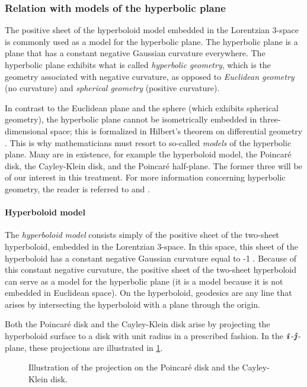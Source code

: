 \subsubsection{Relation with models of the hyperbolic plane}
The positive sheet of the hyperboloid model embedded in the Lorentzian 3-space is commonly used as a model for the hyperbolic plane. The hyperbolic plane is a plane that has a constant negative Gaussian curvature everywhere. The hyperbolic plane exhibits what is called \emph{hyperbolic geometry}, which is the geometry associated with negative curvature, as opposed to \emph{Euclidean geometry} (no curvature) and \emph{spherical geometry} (positive curvature). 

In contrast to the Euclidean plane and the sphere (which exhibits spherical geometry), the hyperbolic plane cannot be isometrically embedded in three-dimensional space; this is formalized in Hilbert's theorem on differential geometry \cite{Thurston1997}. This is why mathematicians must resort to so-called \emph{models} of the hyperbolic plane. Many are in existence, for example the hyperboloid model, the Poincaré disk, the Cayley-Klein disk, and the Poincaré half-plane. The former three will be of our interest in this treatment. For more information concerning hyperbolic geometry, the reader is referred to \citet{Needham1997,Needham2021} and \citet{Thurston1997}.

\paragraph{Hyperboloid model} The \emph{hyperboloid model} consists simply of the positive sheet of the two-sheet hyperboloid, embedded in the Lorentzian 3-space. In this space, this sheet of the hyperboloid has a constant negative Gaussian curvature equal to -1 \cite{Balazs1986}. Because of this constant negative curvature, the positive sheet of the two-sheet hyperboloid can serve as a model for the hyperbolic plane (it is a model because it is not embedded in Euclidean space). On the hyperboloid, geodesics are any line that arises by intersecting the hyperboloid with a plane through the origin.

Both the Poincaré disk and the Cayley-Klein disk arise by projecting the hyperboloid surface to a disk with unit radius in a prescribed fashion. In the $\quati$-$\quatj$-plane, these projections are illustrated in \cref{fig:hyperboloid_projection}.

\begin{figure}[ht!]
    \centering
    
    \caption{Illustration of the projection on the Poincaré disk and the Cayley-Klein disk.}
    \label{fig:hyperboloid_projection}
\end{figure}


